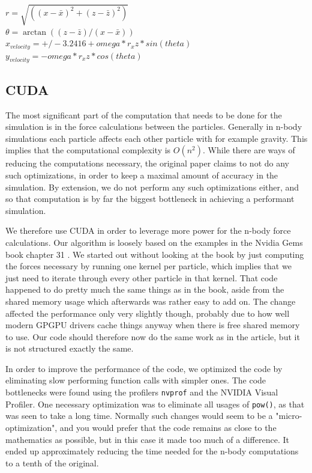 \documentclass[a4paper]{article}
\begin{document}
\begin{center}
$r = \sqrt{((x - \bar{x})^2 + (z - \bar{z})^2)}$ \\
$\theta = \arctan((z - \bar{z})/(x - \bar{x}))$ \\
$x_{velocity} = +/-3.2416 + omega*r_xz*sin(theta)$ \\
$y_{velocity} = -omega*r_xz*cos(theta)$ \\
\end{center}


\subsection{CUDA}

The most significant part of the computation that needs to be done for the simulation is in the force calculations between the particles.
Generally in n-body simulations each particle affects each other particle with for example gravity.
This implies that the computational complexity is $O(n^2)$.
While there are ways of reducing the computations necessary, the original paper claims to not do any such optimizations, in order to keep a maximal amount of accuracy in the simulation.
By extension, we do not perform any such optimizations either, and so that computation is by far the biggest bottleneck in achieving a performant simulation.

We therefore use CUDA in order to leverage more power for the n-body force calculations.
Our algorithm is loosely based on the examples in the Nvidia Gems book chapter 31 \cite{nvidia_gems}.
We started out without looking at the book by just computing the forces necessary by running one kernel per particle, which implies that we just need to iterate through every other particle in that kernel.
That code happened to do pretty much the same things as in the book, aside from the shared memory usage which afterwards was rather easy to add on.
The change affected the performance only very slightly though, probably due to how well modern GPGPU drivers cache things anyway when there is free shared memory to use.
Our code should therefore now do the same work as in the article, but it is not structured exactly the same.

In order to improve the performance of the code, we optimized the code by eliminating slow performing function calls with simpler ones.
The code bottlenecks were found using the profilers \verb|nvprof| and the NVIDIA Visual Profiler.
One necessary optimization was to eliminate all usages of \verb|pow()|, as that was seen to take a long time.
Normally such changes would seem to be a "micro-optimization", and you would prefer that the code remains as close to the mathematics as possible, but in this case it made too much of a difference.
It ended up approximately reducing the time needed for the n-body computations to a tenth of the original.
\end{document}
